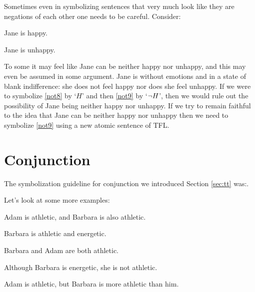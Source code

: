 Sometimes even in symbolizing sentences that very much look like they are negations of each other one needs to be careful. Consider:
	\begin{earg}
		\item[\ex{not8}] Jane is happy.
		\item[\ex{not9}] Jane is unhappy.
	\end{earg}
To some it may feel like Jane can be neither happy nor unhappy, and this may even be assumed in some argument. Jane is without emotions and in a state of blank indifference: she does not feel happy nor does she feel unhappy. If we were to symbolize \ref{not8} by `$H$' and then \ref{not9} by `$\neg H$', then we would rule out the possibility of Jane being neither happy nor unhappy. If we try to remain faithful to the idea that Jane can be neither happy nor unhappy then we need to symbolize \ref{not9} using a new atomic sentence of TFL.

\section{Conjunction}
\label{s:ConnectiveConjunction}

The symbolization guideline for conjunction we introduced Section \ref{sec:tt} was:.



Let's look at some more examples:
	\begin{earg}
	        \item[\ex{and3}]Adam is athletic, and Barbara is also athletic.
		\item[\ex{and4}]Barbara is athletic and energetic.
		\item[\ex{and5}]Barbara and Adam are both athletic.
		\item[\ex{and6}]Although Barbara is energetic, she is not athletic.
	\item[\ex{and7}]Adam is athletic, but Barbara is more athletic than him.
	\end{earg}

